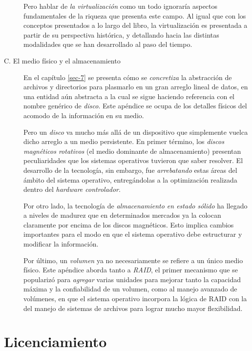 \documentclass[11pt,fleqn]{book} %
\begin{document}
\begin{description}
     Pero hablar de \emph{la virtualización} como un todo ignoraría
     aspectos fundamentales de la riqueza que presenta este campo. Al
     igual que con los conceptos presentados a lo largo del libro, la
     virtualización es presentada a partir de su perspectiva
     histórica, y detallando hacia las distintas modalidades que se
     han desarrollado al paso del tiempo.
\item[C. El medio físico y el almacenamiento] En el capítulo \ref{sec-7} se
     presenta cómo se \emph{concretiza} la abstracción de archivos y
     directorios para plasmarlo en un gran arreglo lineal de datos, en
     una entidad aún abstracta a la cual se sigue haciendo referencia
     con el nombre genérico de \emph{disco}. Este apéndice se ocupa de los
     detalles físicos del acomodo de la información en su medio.

     Pero un \emph{disco} va mucho más allá de un dispositivo que
     simplemente vuelca dicho arreglo a un medio persistente. En
     primer término, los \emph{discos magnéticos rotativos} (el medio
     dominante de almacenamiento) presentan peculiaridades que los
     sistemas operativos tuvieron que saber resolver. El desarrollo de
     la tecnología, sin embargo, fue \emph{arrebatando} estas áreas del
     ámbito del sistema operativo, entregándolas a la optimización
     realizada dentro del \emph{hardware controlador}.

     Por otro lado, la tecnología de \emph{almacenamiento en estado sólido}
     ha llegado a niveles de madurez que en determinados mercados ya
     la colocan claramente por encima de los discos magnéticos. Esto
     implica cambios importantes para el modo en que el sistema
     operativo debe estructurar y modificar la información.

     Por último, un \emph{volumen} ya no necesariamente se refiere a un
     único medio físico. Este apéndice aborda tanto a \emph{RAID}, el
     primer mecanismo que se popularizó para \emph{agregar} varias unidades
     para mejorar tanto la capacidad máxima y la confiabilidad de un
     volumen, como al manejo avanzado de volúmenes, en que el sistema
     operativo incorpora la lógica de RAID con la del manejo de
     sistemas de archivos para lograr mucho mayor flexibilidad.
\end{description}

\section*{Licenciamiento}
\end{document}
